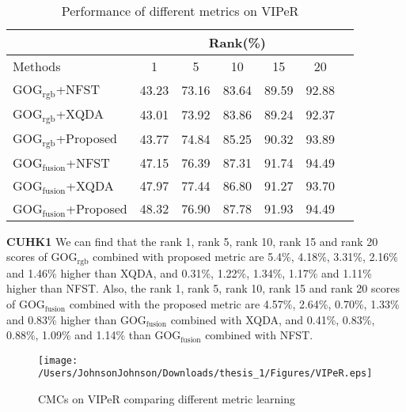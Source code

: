 \begin{table}[H]
\caption{Performance of different metrics on VIPeR}
\centering
 \begin{tabular}{|l|c|c|c|c|c|c|}
\hline
& \multicolumn{5}{|c|}{Rank(\%)} \\
\hline
Methods& 1 & 5 &10& 15&20\\
\hline
GOG$_\text{rgb}$+NFST& 43.23&73.16 &83.64 & 89.59&92.88\\  
\hline
GOG$_\text{rgb}$+XQDA& 43.01&73.92&83.86& 89.24& 92.37\\
\hline
GOG$_\text{rgb}$+Proposed&43.77 &74.84&85.25&90.32&93.89\\   %
\hline
GOG$_\text{fusion}$+NFST&47.15& 76.39&87.31&91.74&94.49\\
\hline
GOG$_\text{fusion}$+XQDA& 47.97& 77.44& 86.80& 91.27&93.70\\  
\hline
GOG$_\text{fusion}$+Proposed&48.32&76.90&87.78&91.93&94.49\\ %

\hline

\end{tabular}
\end{table}
\textbf{CUHK1} We can find that the rank 1, rank 5, rank 10, rank 15 and rank 20 scores of GOG$_\text{rgb}$ combined with proposed metric are 5.4\%, 4.18\%, 3.31\%, 2.16\% and 1.46\% higher than XQDA, and 0.31\%, 1.22\%, 1.34\%, 1.17\% and 1.11\% higher than NFST.  Also, the  rank 1, rank 5, rank 10, rank 15 and rank 20 scores of GOG$_\text{fusion}$ combined with the proposed metric are 4.57\%, 2.64\%, 0.70\%, 1.33\% and 0.83\% higher than GOG$_\text{fusion}$ combined with XQDA, and 0.41\%, 0.83\%, 0.88\%, 1.09\% and 1.14\% than GOG$_\text{fusion}$ combined with NFST.  

\begin{figure}[H]
\begin{raggedleft}
\texttt{[image: /Users/JohnsonJohnson/Downloads/thesis\_1/Figures/VIPeR.eps]}
\vspace{-3em}
\caption{CMCs on VIPeR comparing different metric learning}
\end{raggedleft}
\end{figure}


